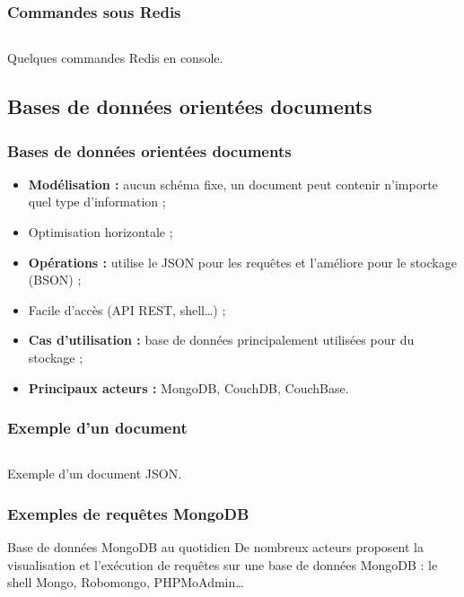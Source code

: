 	\begin{frame}
		\frametitle{Commandes sous Redis}

		\begin{listing}[H]
			\inputminted[fontsize=\tiny, linenos=true]{text}{code/commandesRedis.txt}
			\caption{Quelques commandes Redis en console.}
		\end{listing}
	\end{frame}

	\subsection{Bases de données orientées documents}
	\begin{frame}
		\frametitle{Bases de données orientées documents}

		\begin{itemize}
			\item \textbf{Modélisation :} aucun schéma fixe, un document peut contenir n'importe quel type d'information ;
			\item Optimisation horizontale ;
			\item \textbf{Opérations :} utilise le JSON pour les requêtes et l'améliore pour le stockage (BSON) ;
			\item Facile d'accès (API REST, shell\dots) ;
			\item \textbf{Cas d'utilisation :} base de données principalement utilisées pour du stockage ;
			\item \textbf{Principaux acteurs :} MongoDB, CouchDB, CouchBase.
		\end{itemize}
	\end{frame}

	\begin{frame}
		\frametitle{Exemple d'un document}

		\begin{listing}[H]
			\inputminted[fontsize=\tiny, linenos=true]{json}{code/exemple-document.json}
			\caption{Exemple d'un document JSON.}
		\end{listing}
	\end{frame}

	\begin{frame}
		\frametitle{Exemples de requêtes MongoDB}


		\begin{exampleblock}{Base de données MongoDB au quotidien}
			De nombreux acteurs proposent la visualisation et l'exécution de requêtes sur une base de données MongoDB : le shell Mongo, Robomongo, PHPMoAdmin\dots
		\end{exampleblock}

	\end{frame}
